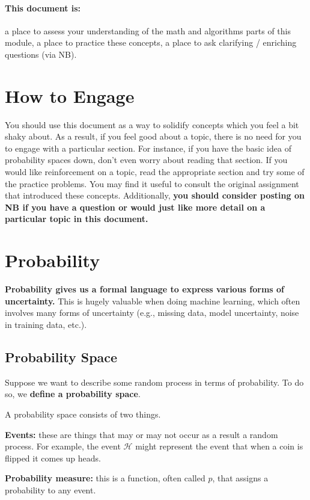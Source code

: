 \documentclass{tufte-handout}
\begin{document}
 \paragraph{\textbf{This document is:}} a place to assess your understanding of the math and algorithms parts of this module, a place to practice these concepts, a place to ask clarifying / enriching questions (via NB).

\section{How to Engage}

You should use this document as a way to solidify concepts which you feel a bit shaky about.  As a result, if you feel good about a topic, there is no need for you to engage with a particular section.  For instance, if you have the basic idea of probability spaces down, don't even worry about reading that section.  If you would like reinforcement on a topic, read the appropriate section and try some of the practice problems.  You may find it useful to consult the original assignment that introduced these concepts.  Additionally, \textbf{you should consider posting on NB if you have a question or would just like more detail on a particular topic in this document.}


\section{Probability}

\textbf{Probability gives us a formal language to express various forms of uncertainty.}  This is hugely valuable when doing machine learning, which often involves many forms of uncertainty (e.g., missing data, model uncertainty, noise in training data, etc.).

\subsection{Probability Space}
Suppose we want to describe some random process in terms of probability.  To do so, we \textbf{define a probability space}.

A probability space consists of two things.
\bi
\item \textbf{Events:} these are things that may or may not occur as a result a random process.  For example, the event $\mathcal{H}$ might represent the event that when a coin is flipped it comes up heads.
\item \textbf{Probability measure:} this is a function, often called $p$, that assigns a probability to any event.
\end{document}
